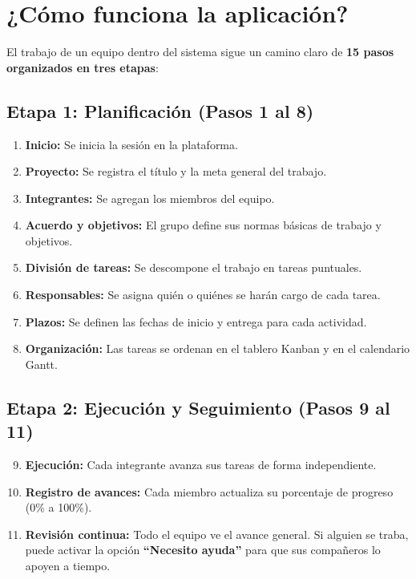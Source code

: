 \documentclass[11pt,a4paper]{article}
\begin{document}
\section{¿Cómo funciona la aplicación?}

El trabajo de un equipo dentro del sistema sigue un camino claro de \textbf{15 pasos organizados en tres etapas}:

\subsection{Etapa 1: Planificación (Pasos 1 al 8)}
\begin{enumerate}
    \item \textbf{Inicio:} Se inicia la sesión en la plataforma.
    \item \textbf{Proyecto:} Se registra el título y la meta general del trabajo.
    \item \textbf{Integrantes:} Se agregan los miembros del equipo.
    \item \textbf{Acuerdo y objetivos:} El grupo define sus normas básicas de trabajo y objetivos.
    \item \textbf{División de tareas:} Se descompone el trabajo en tareas puntuales.
    \item \textbf{Responsables:} Se asigna quién o quiénes se harán cargo de cada tarea.
    \item \textbf{Plazos:} Se definen las fechas de inicio y entrega para cada actividad.
    \item \textbf{Organización:} Las tareas se ordenan en el tablero Kanban y en el calendario Gantt.
\end{enumerate}

\subsection{Etapa 2: Ejecución y Seguimiento (Pasos 9 al 11)}
\begin{enumerate}
    \setcounter{enumi}{8}
    \item \textbf{Ejecución:} Cada integrante avanza sus tareas de forma independiente.
    \item \textbf{Registro de avances:} Cada miembro actualiza su porcentaje de progreso (0\% a 100\%).
    \item \textbf{Revisión continua:} Todo el equipo ve el avance general. Si alguien se traba, puede activar la opción \textbf{``Necesito ayuda''} para que sus compañeros lo apoyen a tiempo.
\end{enumerate}
\end{document}
